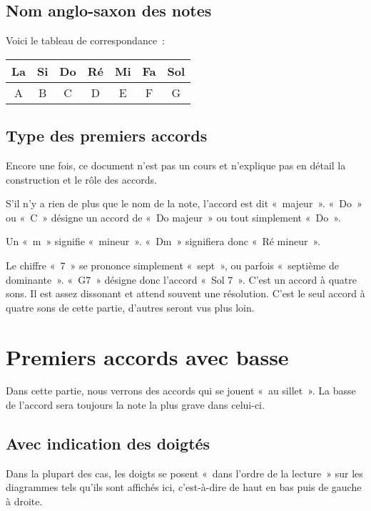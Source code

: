 \documentclass[11pt]{article}
\begin{document}
\subsection{Nom anglo-saxon des notes}

Voici le tableau de correspondance~:

\begin{tabular}{ | c | c | c | c | c | c | c | }
    \hline
    La & Si & Do & Ré & Mi & Fa & Sol \\
    \hline
    A & B & C & D & E & F & G \\
    \hline
\end{tabular}

\subsection{Type des premiers accords}

Encore une fois, ce document n’est pas un cours et n’explique pas en détail
la construction et le rôle des accords.

S’il n’y a rien de plus que le nom de la note, l’accord est dit «~majeur~».
«~Do~» ou «~C~» désigne un accord de «~Do majeur~» ou tout simplement «~Do~».

Un «~m~» signifie «~mineur~». «~Dm~» signifiera donc «~Ré mineur~».

Le chiffre «~7~» se prononce simplement «~sept~», ou parfois «~septième de
dominante~». «~G7~» désigne donc l’accord «~Sol 7~».
C’est un accord à quatre sons. Il est assez dissonant et
attend souvent une résolution. C’est le seul accord à quatre sons de cette
partie, d’autres seront vus plus loin.

\section{Premiers accords avec basse}

Dans cette partie, nous verrons des accords qui se jouent «~au sillet~».
La basse de l’accord sera toujours la note la plus grave dans celui-ci.

\subsection{Avec indication des doigtés}

Dans la plupart des cas, les doigts se posent «~dans l’ordre de la lecture~»
sur les diagrammes tels qu’ils sont affichés ici, c’est-à-dire de haut en bas
puis de gauche à droite. 
\end{document}
